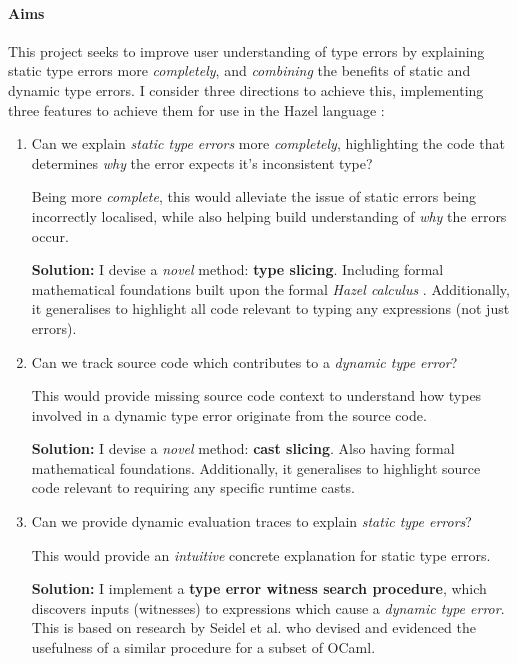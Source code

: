 \paragraph{Aims} This project seeks to improve user understanding of type errors by explaining static type errors more \textit{completely}, and \textit{combining} the benefits of static and dynamic type errors. I consider three directions to achieve this, implementing three features to achieve them for use in the Hazel language \cite{Hazel}:
\begin{enumerate}
\item Can we explain \textit{static type errors} more \textit{completely}, highlighting the code that determines \textit{why} the error expects it's inconsistent type? 

Being more \textit{complete}, this would alleviate the issue of static errors being incorrectly localised, while also helping build understanding of \textit{why} the errors occur.

\textbf{Solution:} I devise a \textit{novel} method: \textbf{type slicing}. Including formal mathematical foundations built upon the formal \textit{Hazel calculus} \cite{HazelLivePaper}. Additionally, it generalises to highlight all code relevant to typing any expressions (not just errors).

\item Can we track source code which contributes to a \textit{dynamic type error}?

This would provide missing source code context to understand how types involved in a dynamic type error originate from the source code.

\textbf{Solution:} I devise a \textit{novel} method: \textbf{cast slicing}. Also having formal mathematical foundations. Additionally, it generalises to highlight source code relevant to requiring any specific runtime casts.

\item Can we provide dynamic evaluation traces to explain \textit{static type errors}?

This would provide an \textit{intuitive} concrete explanation for static type errors.

\textbf{Solution:} I implement a \textbf{type error witness search procedure}, which discovers inputs (witnesses) to expressions which cause a \textit{dynamic type error}. This is based on research by Seidel et al. \cite{SearchProc} who devised and evidenced the usefulness of a similar procedure for a subset of OCaml.
\end{enumerate}

